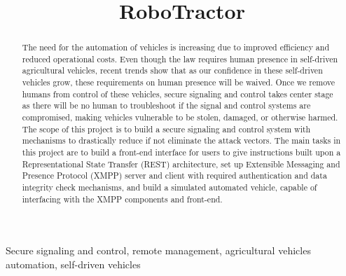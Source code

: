 \documentclass[conference,12pt]{IEEEtran}
\begin{document}
%
\title{RoboTractor}
\author{
\and
{}
\and
{}
}
\maketitle


\begin{abstract}
The need for the automation of vehicles is increasing due to improved
efficiency and reduced operational costs. Even though the law requires human
presence in self-driven agricultural vehicles, recent trends show that as
our confidence in these self-driven vehicles grow, these requirements on
human presence will be waived. Once we remove humans from control of these
vehicles, secure signaling and control takes center stage as there will be
no human to troubleshoot if the signal and control systems are compromised,
making vehicles vulnerable to be stolen, damaged, or otherwise harmed. The
scope of this project is to build a secure signaling and control system with
mechanisms to drastically reduce if not eliminate the attack vectors. The
main tasks in this project are to build a front-end interface for users to
give instructions built upon a Representational State Transfer (REST)
architecture, set up Extensible Messaging and Presence Protocol (XMPP)
server and client with required authentication and data integrity check
mechanisms, and build a simulated automated vehicle, capable of
interfacing with the XMPP components and front-end.  
\end{abstract}

\begin{IEEEkeywords}
    Secure signaling and control, remote management, agricultural vehicles automation, self-driven vehicles
\end{IEEEkeywords}
\end{document}

